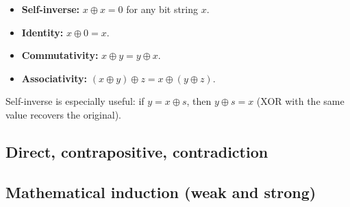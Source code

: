\begin{remark}
\begin{itemize}
    \item \textbf{Self-inverse:} $x \oplus x = 0$ for any bit string $x$.
    \item \textbf{Identity:} $x \oplus 0 = x$.
    \item \textbf{Commutativity:} $x \oplus y = y \oplus x$.
    \item \textbf{Associativity:} $(x \oplus y) \oplus z = x \oplus (y \oplus z)$.
\end{itemize}
Self-inverse is especially useful: if $y = x \oplus s$, then $y \oplus s = x$ (XOR with the same value recovers the original).
\end{remark}

\subsection{Direct, contrapositive, contradiction}


\subsection{Mathematical induction (weak and strong)}


